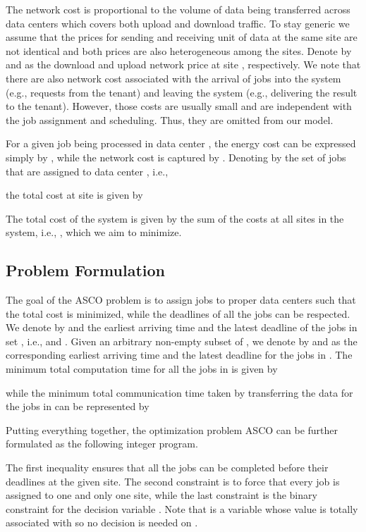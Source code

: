 \documentclass{article}
\begin{document}
The network cost  is proportional to the volume of data being transferred across data centers which covers both upload and download traffic. To stay generic we assume that the prices for sending and receiving unit of data at the same site are not identical and both prices are also heterogeneous among the sites. Denote by  and  as the download and upload network price at site , respectively. We note that there are also network cost associated with the arrival of jobs into the system (e.g., requests from the tenant) and leaving the system (e.g., delivering the result to the tenant). However, those costs are usually small and are independent with the job assignment and scheduling. Thus, they are omitted from our model.

For a given job  being processed in data center , the energy cost can be expressed simply by , while the network cost is captured by . Denoting by  the set of jobs that are assigned to data center , i.e.,

the total cost  at site  is given by

The total cost  of the system is given by the sum of the costs at all sites in the system, i.e., , which we aim to minimize.

\subsection{Problem Formulation}

The goal of the ASCO problem is to assign jobs to proper data centers such that the total cost  is minimized, while the deadlines of all the jobs can be respected. We denote by  and  the earliest arriving time and the latest deadline of the jobs in set , i.e.,  and . Given an arbitrary non-empty subset  of , we denote by  and  as the corresponding earliest arriving time and the latest deadline for the jobs in . The minimum total computation time for all the jobs in  is given by

while the minimum total communication time taken by transferring the data for the jobs in  can be represented by

Putting everything together, the optimization problem ASCO can be further formulated as the following integer program.

The first inequality ensures that all the jobs can be completed before their deadlines at the given site. The second constraint is to force that every job is assigned to one and only one site, while the last constraint is the binary constraint for the decision variable . Note that  is a variable whose value is totally associated with  so no decision is needed on .
\end{document}
